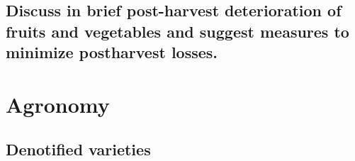 \documentclass[]{book}
\begin{document}
\hypertarget{discuss-in-brief-post-harvest-deterioration-of-fruits-and-vegetables-and-suggest-measures-to-minimize-postharvest-losses.}{%
\section{Discuss in brief post-harvest deterioration of fruits and vegetables and suggest measures to minimize postharvest losses.}\label{discuss-in-brief-post-harvest-deterioration-of-fruits-and-vegetables-and-suggest-measures-to-minimize-postharvest-losses.}}

\hypertarget{agronomy}{%
\chapter{Agronomy}\label{agronomy}}

\hypertarget{denotified-varieties}{%
\section{Denotified varieties}\label{denotified-varieties}}
\end{document}
